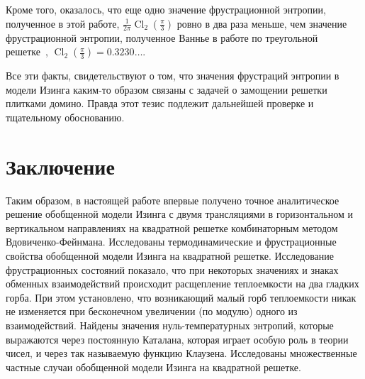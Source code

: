 \documentclass[utf8,12pt]{jetp}
\DeclareMathOperator{\Cl}{Cl}
\begin{document}
Кроме того, оказалось, что еще одно значение фрустрационной энтропии, полученное в этой работе, $\frac{1}{2\pi} \Cl_2 (\frac{\pi}{3})$ ровно в два раза меньше, чем значение фрустрационной энтропии, полученное Ваннье в работе по треугольной решетке~\cite{wannier1950}, $\Cl_2 (\frac{\pi}{3}) = 0.3230\dots$.  

Все эти факты, свидетельствуют о том, что значения фрустраций энтропии в модели Изинга каким-то образом связаны с задачей о замощении решетки плитками домино. Правда этот тезис подлежит дальнейшей проверке и тщательному обоснованию.

%

\section{Заключение}
		
Таким образом, в настоящей работе впервые получено точное аналитическое решение обобщенной модели Изинга с двумя трансляциями в горизонтальном и вертикальном направлениях на квадратной решетке комбинаторным методом Вдовиченко-Фейнмана. Исследованы термодинамические и фрустрационные свойства обобщенной модели Изинга на квадратной решетке. Исследование фрустрационных состояний показало, что при некоторых значениях и знаках обменных взаимодействий происходит расщепление теплоемкости на два гладких горба. При этом установлено, что возникающий малый горб теплоемкости никак не изменяется при бесконечном увеличении (по модулю) одного из взаимодействий. Найдены значения нуль-температурных энтропий, которые выражаются через постоянную Каталана, которая играет особую роль в теории чисел, и через так называемую функцию Клаузена. Исследованы множественные частные случаи обобщенной модели Изинга на квадратной решетке.
\end{document}

